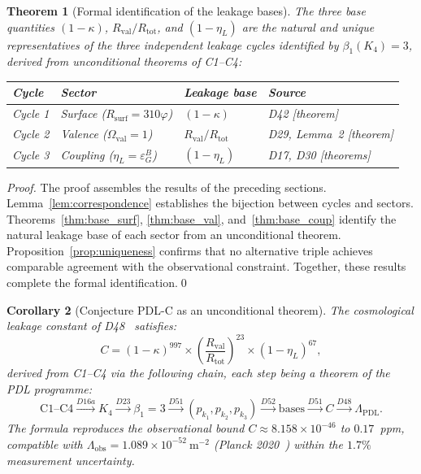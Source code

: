 \documentclass[12pt,a4paper]{article}
\newtheorem{theorem}{Theorem}[section]
\newtheorem{corollary}[theorem]{Corollary}
\newcommand{\Kfour}{K_4}
\newcommand{\Rsurf}{R_{\mathrm{surf}}}
\newcommand{\Rtot}{R_{\mathrm{tot}}}
\newcommand{\Rval}{R_{\mathrm{val}}}
\newcommand{\kap}{\kappa}
\newcommand{\etaL}{\eta_L}
\newcommand{\vp}{\varphi}
\newcommand{\Ov}{\Omega_{\mathrm{val}}}
\begin{document}
\begin{theorem}[Formal identification of the leakage bases]
\label{thm:main}
The three base quantities $(1-\kap)$, $\Rval/\Rtot$, and $(1-\etaL)$ are the natural and unique representatives of the three independent leakage cycles identified by $\beta_1(\Kfour) = 3$, derived from unconditional theorems of C1--C4:
\begin{center}
\renewcommand{\arraystretch}{1.4}
\begin{tabular}{llll}
\toprule
Cycle & Sector & Leakage base & Source \\
\midrule
Cycle 1 & Surface ($\Rsurf = 310\vp$) & $(1-\kap)$ & D42 [theorem] \\
Cycle 2 & Valence ($\Ov = 1$) & $\Rval/\Rtot$ & D29, Lemma~2 [theorem] \\
Cycle 3 & Coupling ($\etaL = \varepsilon_G^B$) & $(1-\etaL)$ & D17, D30 [theorems] \\
\bottomrule
\end{tabular}
\end{center}
\end{theorem}

\begin{proof}
The proof assembles the results of the preceding sections. Lemma~\ref{lem:correspondence} establishes the bijection between cycles and sectors. Theorems~\ref{thm:base_surf}, \ref{thm:base_val}, and~\ref{thm:base_coup} identify the natural leakage base of each sector from an unconditional theorem. Proposition~\ref{prop:uniqueness} confirms that no alternative triple achieves comparable agreement with the observational constraint. Together, these results complete the formal identification.\qed
\end{proof}

\begin{corollary}[Conjecture PDL-C as an unconditional theorem]
\label{cor:PDL_C}
The cosmological leakage constant of D48~\cite{PDL_D48_2026} satisfies:
\begin{equation}
\boxed{C = (1-\kap)^{997} \times \left(\frac{\Rval}{\Rtot}\right)^{23} \times (1-\etaL)^{67},}
\label{eq:C_final}
\end{equation}
derived from C1--C4 via the following chain, each step being a theorem of the PDL programme:
\[
\mathrm{C1}\text{--}\mathrm{C4} \xrightarrow{D16a} \Kfour \xrightarrow{D23} \beta_1 = 3 \xrightarrow{D51} (p_{k_1}, p_{k_2}, p_{k_3}) \xrightarrow{D52} \text{bases} \xrightarrow{D51} C \xrightarrow{D48} \Lambda_{\mathrm{PDL}}.
\]
The formula reproduces the observational bound $C \approx 8.158 \times 10^{-46}$ to $0.17$~ppm, compatible with $\Lambda_{\mathrm{obs}} = 1.089 \times 10^{-52}~\mathrm{m}^{-2}$ (Planck 2020~\cite{Planck2020}) within the $1.7\%$ measurement uncertainty.
\end{corollary}
\end{document}
